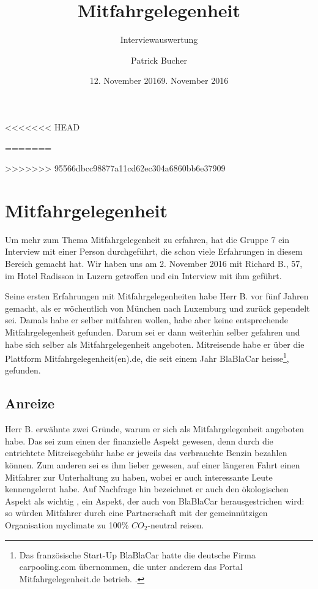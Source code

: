\documentclass[11pt,a4paper]{scrartcl}
\begin{document}
\title{Mitfahrgelegenheit}
\subtitle{Interviewauswertung}
\author{Patrick Bucher}
<<<<<<< HEAD
\date{12. November 2016}
=======
\date{9. November 2016}
>>>>>>> 95566dbcc98877a11cd62ec304a6860bb6e37909
\maketitle

\section{Mitfahrgelegenheit}
Um mehr zum Thema Mitfahrgelegenheit zu erfahren, hat die Gruppe 7 ein Interview mit einer Person durchgeführt, die schon viele Erfahrungen in diesem Bereich gemacht hat. Wir haben uns am 2. November 2016 mit Richard B., 57, im Hotel Radisson in Luzern getroffen und ein Interview mit ihm geführt.

Seine ersten Erfahrungen mit Mitfahrgelegenheiten habe Herr B. vor fünf Jahren gemacht, als er wöchentlich von München nach Luxemburg und zurück gependelt sei. Damals habe er selber mitfahren wollen, habe aber keine entsprechende Mitfahrgelegenheit gefunden. Darum sei er dann weiterhin selber gefahren und habe sich selber als Mitfahrgelegenheit angeboten. \cite[Zeilen 2-6]{interview} Mitreisende habe er über die Plattform Mitfahrgelegenheit(en).de, die seit einem Jahr BlaBlaCar heisse\footnote{Das französische Start-Up BlaBlaCar hatte die deutsche Firma carpooling.com übernommen, die unter anderem das Portal Mitfahrgelegenheit.de betrieb. \cite{afp}. }, gefunden. \cite[Zeilen 11-12]{interview}

\subsection{Anreize}

Herr B. erwähnte zwei Gründe, warum er sich als Mitfahrgelegenheit angeboten habe. Das sei zum einen der finanzielle Aspekt gewesen, denn durch die entrichtete Mitreisegebühr habe er jeweils das verbrauchte Benzin bezahlen können. \cite[Zeilen 20; 53]{interview} Zum anderen sei es ihm lieber gewesen, auf einer längeren Fahrt einen Mitfahrer zur Unterhaltung zu haben, wobei er auch interessante Leute kennengelernt habe. \cite[Zeilen 21-22; 30-32]{interview} Auf Nachfrage hin bezeichnet er auch den ökologischen Aspekt als wichtig \cite[Zeilen 24-27]{interview}, ein Aspekt, der auch von BlaBlaCar herausgestrichen wird: so würden Mitfahrer durch eine Partnerschaft mit der gemeinnützigen Organisation myclimate zu 100\% $CO_2$-neutral reisen. \cite{blablacar}
\end{document}
